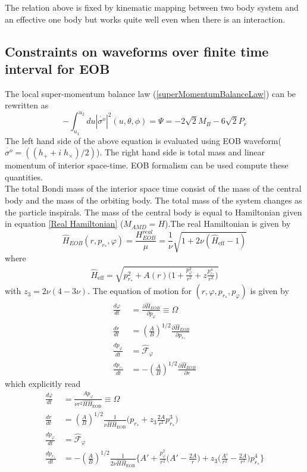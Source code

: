 \documentclass[prd,preprintnumbers,onecolumn,eqsecnum,floatfix,letter]{revtex4}
\begin{document}
The relation above is fixed by kinematic mapping between two body system and an effective one body but works quite well even when there is an interaction. 
\subsection{Constraints on waveforms over finite time interval for EOB} 
The local super-momentum balance law (\ref{superMomentumBalanceLaw}) can be rewritten as 
\begin{equation}
	-\int_{u_{1}}^{u_{2}} du |\dot{\sigma^{o}}|^{2}(u, \theta, \phi) = \Psi = -2\sqrt{2}M_{B} - 6\sqrt{2}P_{r}
\end{equation} 
The left hand side of the above equation is evaluated using EOB waveform($\dot{\sigma^{o}} = \left(\left(h_+ + i\;h_\times\right)/2\right)$). The right hand side is total mass and linear momentum of interior space-time. EOB formalism can be used compute these quantities. \\
The total Bondi mass of the interior space time consist of the mass of the central body and the mass of the orbiting body. The total mass of the system changes as the particle inspirals. The mass of the central body is equal to Hamiltonian given in equation \ref{Real Hamiltonian} ($M_{AMD} = H$).The real Hamiltonian is given by
    \begin{equation}
    	\hat{H}_{EOB}(r, p_{r_*}, \varphi) = \frac{H^{real}_{EOB}}{\mu} = \frac{1}{\nu}\sqrt{1 + 2\nu\left(\hat{H}_{\text{eff}}-1\right)}\nonumber
    \end{equation}
where
\begin{align}
\hat{H}_{\text{eff}} = \sqrt{p^2_{r_*} + A\left(r\right)\Bigg(1 + \frac{p_{\varphi}^2}{r^2} + z\frac{p_{r_*}^4}{r^2}\Bigg)}
\end{align}
with $z_3 = 2\nu(4-3\nu)$. The equation of motion for $\left(r, \varphi, p_{r_*}, p_{\varphi}\right)$ is given by
\begin{align}
	\frac{d\varphi}{dt} &= \frac{\partial\hat{H}_{EOB}}{\partial p_{\varphi}} \equiv \Omega\\
	\frac{dr}{dt} &=\left(\frac{A}{B}\right)^{1/2}\frac{\partial\hat{H}_{EOB}}{\partial p_{r_*}}\\
	\frac{dp_{\varphi}}{dt} &=\hat{\mathscr{F}}_{\varphi}\\
	\frac{dp_{r_*}}{dt} &=-\left(\frac{A}{B}\right)^{1/2}\frac{\partial\hat{H}_{EOB}}{\partial r}
\end{align}
which explicitly read
\begin{align}
\frac{d\varphi}{dt} &= \frac{A p_{\varphi}}{\nu r^2 \hat{H}\hat{H}_{\text{EOB}}} \equiv \Omega\\
\frac{dr}{dt} &=\left(\frac{A}{B}\right)^{1/2}\frac{1}{\nu\hat{H}\hat{H}_{\text{EOB}}}\Bigg(p_{r_*} + z_{3}\frac{2A}{r^2}p_{r_*}^3\Bigg)\\
\frac{dp_{\varphi}}{dt} &=\hat{\mathscr{F}}_{\varphi}\\
\frac{dp_{r_*}}{dt} &=-\left(\frac{A}{B}\right)^{1/2}\frac{1}{2\nu\hat{H}\hat{H}_{\text{EOB}}}\Bigg\{A' + \frac{p_{\varphi}^2}{r^2}\Bigg(A'- \frac{2A}{r}\Bigg) + z_3\Bigg(\frac{A'}{r^2}- \frac{2A}{r^3}\Bigg)p_{r_*}^4\Bigg\}
\end{align}
\end{document}

